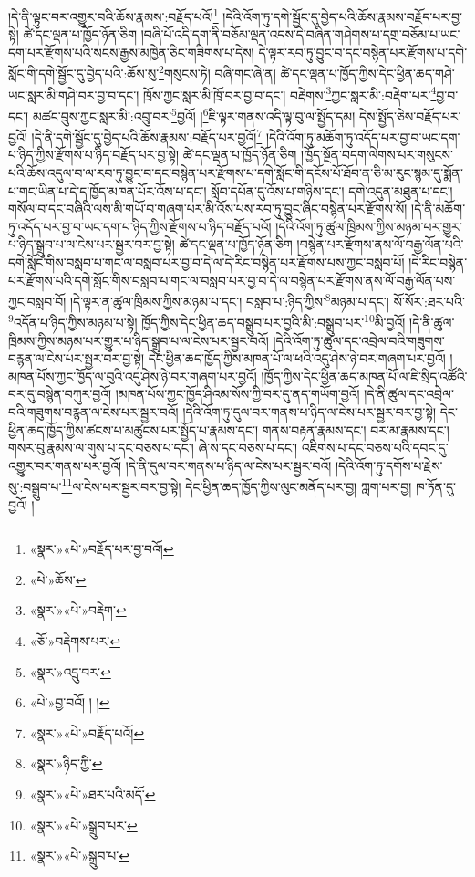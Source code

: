 །དེ་ནི་ལྟུང་བར་འགྱུར་བའི་ཆོས་རྣམས་:བརྗོད་པའོ།\footnote{«སྣར་»«པེ་»བརྗོད་པར་བྱ་བའོ།} །དེའི་འོག་ཏུ་དགེ་སྦྱོང་དུ་བྱེད་པའི་ཆོས་རྣམས་བརྗོད་པར་བྱ་སྟེ། ཚེ་དང་ལྡན་པ་ཁྱོད་ཉོན་ཅིག །བཞི་པོ་འདི་དག་ནི་བཅོམ་ལྡན་འདས་དེ་བཞིན་གཤེགས་པ་དགྲ་བཅོམ་པ་ཡང་དག་པར་རྫོགས་པའི་སངས་རྒྱས་མཁྱེན་ཅིང་གཟིགས་པ་དེས། དེ་ལྟར་རབ་ཏུ་བྱུང་བ་དང་བསྙེན་པར་རྫོགས་པ་དགེ་སློང་གི་དགེ་སྦྱོང་དུ་བྱེད་པའི་:ཆོས་སུ་\footnote{«པེ་»ཆོས་}གསུངས་ཏེ། བཞི་གང་ཞེ་ན། ཚེ་དང་ལྡན་པ་ཁྱོད་ཀྱིས་དེང་ཕྱིན་ཆད་གཤེ་ཡང་སླར་མི་གཤེ་བར་བྱ་བ་དང་། ཁྲོས་ཀྱང་སླར་མི་ཁྲོ་བར་བྱ་བ་དང་། བརྡེགས་\footnote{«སྣར་»«པེ་»བརྡེག་}ཀྱང་སླར་མི་:བརྡེག་པར་\footnote{«ཅོ་»བརྡེགས་པར་}བྱ་བ་དང་། མཚང་བྲུས་ཀྱང་སླར་མི་:འབྲུ་བར་\footnote{«སྣར་»འདྲུ་བར་}བྱའོ། །\footnote{«པེ་»བྱ་བའོ། ། །}ཇི་ལྟར་གནས་འདི་ལྟ་བུ་ལ་སྤྱོད་དམ། དེས་སྤྱོད་ཅེས་བརྗོད་པར་བྱའོ། །དེ་ནི་དགེ་སྦྱོང་དུ་བྱེད་པའི་ཆོས་རྣམས་:བརྗོད་པར་བྱའོ།\footnote{«སྣར་»«པེ་»བརྗོད་པའོ།} །དེའི་འོག་ཏུ་མཆོག་ཏུ་འདོད་པར་བྱ་བ་ཡང་དག་པ་ཉིད་ཀྱིས་རྫོགས་པ་ཉིད་བརྗོད་པར་བྱ་སྟེ། ཚེ་དང་ལྡན་པ་ཁྱོད་ཉོན་ཅིག །ཁྱོད་སྔོན་བདག་ལེགས་པར་གསུངས་པའི་ཆོས་འདུལ་བ་ལ་རབ་ཏུ་བྱུང་བ་དང་བསྙེན་པར་རྫོགས་པ་དགེ་སློང་གི་དངོས་པོ་ཐོབ་ན་ཅི་མ་རུང་སྙམ་དུ་སྨོན་པ་གང་ཡིན་པ་དེ་ད་ཁྱོད་མཁན་པོར་འོས་པ་དང་། སློབ་དཔོན་དུ་འོས་པ་གཉིས་དང་། དགེ་འདུན་མཐུན་པ་དང་། གསོལ་བ་དང་བཞིའི་ལས་མི་གཡོ་བ་གཞག་པར་མི་འོས་པས་རབ་ཏུ་བྱུང་ཞིང་བསྙེན་པར་རྫོགས་སོ། །དེ་ནི་མཆོག་ཏུ་འདོད་པར་བྱ་བ་ཡང་དག་པ་ཉིད་ཀྱིས་རྫོགས་པ་ཉིད་བརྗོད་པའོ། །དེའི་འོག་ཏུ་ཚུལ་ཁྲིམས་ཀྱིས་མཉམ་པར་གྱུར་པ་ཉིད་སྒྲུབ་པ་ལ་ངེས་པར་སྦྱར་བར་བྱ་སྟེ། ཚེ་དང་ལྡན་པ་ཁྱོད་ཉོན་ཅིག །བསྙེན་པར་རྫོགས་ནས་ལོ་བརྒྱ་ལོན་པའི་དགེ་སློང་གིས་བསླབ་པ་གང་ལ་བསླབ་པར་བྱ་བ་དེ་ལ་དེ་རིང་བསྙེན་པར་རྫོགས་པས་ཀྱང་བསླབ་པོ། །དེ་རིང་བསྙེན་པར་རྫོགས་པའི་དགེ་སློང་གིས་བསླབ་པ་གང་ལ་བསླབ་པར་བྱ་བ་དེ་ལ་བསྙེན་པར་རྫོགས་ནས་ལོ་བརྒྱ་ལོན་པས་ཀྱང་བསླབ་བོ། །དེ་ལྟར་ན་ཚུལ་ཁྲིམས་ཀྱིས་མཉམ་པ་དང་། བསླབ་པ་:ཉིད་ཀྱིས་\footnote{«སྣར་»ཉིད་ཀྱི་}མཉམ་པ་དང་། སོ་སོར་:ཐར་པའི་\footnote{«སྣར་»«པེ་»ཐར་པའི་མདོ་}འདོན་པ་ཉིད་ཀྱིས་མཉམ་པ་སྟེ། ཁྱོད་ཀྱིས་དེང་ཕྱིན་ཆད་བསྒྲུབ་པར་བྱའི་མི་:བསྒྲུབ་པར་\footnote{«སྣར་»«པེ་»སྒྲུབ་པར་}མི་བྱའོ། །དེ་ནི་ཚུལ་ཁྲིམས་ཀྱིས་མཉམ་པར་གྱུར་པ་ཉིད་སྒྲུབ་པ་ལ་ངེས་པར་སྦྱར་བའོ། །དེའི་འོག་ཏུ་ཚུལ་དང་འབྲེལ་བའི་གཟུགས་བརྙན་ལ་ངེས་པར་སྦྱར་བར་བྱ་སྟེ། དེང་ཕྱིན་ཆད་ཁྱོད་ཀྱིས་མཁན་པོ་ལ་ཕའི་འདུ་ཤེས་ཉེ་བར་གཞག་པར་བྱའོ། །མཁན་པོས་ཀྱང་ཁྱོད་ལ་བུའི་འདུ་ཤེས་ཉེ་བར་གཞག་པར་བྱའོ། །ཁྱོད་ཀྱིས་དེང་ཕྱིན་ཆད་མཁན་པོ་ལ་ཇི་སྲིད་འཚོའི་བར་དུ་བསྙེན་བཀུར་བྱའོ། །མཁན་པོས་ཀྱང་ཁྱོད་ཤིའམ་སོས་ཀྱི་བར་དུ་ནད་གཡོག་བྱའོ། །དེ་ནི་ཚུལ་དང་འབྲེལ་བའི་གཟུགས་བརྙན་ལ་ངེས་པར་སྦྱར་བའོ། །དེའི་འོག་ཏུ་དུལ་བར་གནས་པ་ཉིད་ལ་ངེས་པར་སྦྱར་བར་བྱ་སྟེ། དེང་ཕྱིན་ཆད་ཁྱོད་ཀྱིས་ཚངས་པ་མཚུངས་པར་སྤྱོད་པ་རྣམས་དང་། གནས་བརྟན་རྣམས་དང་། བར་མ་རྣམས་དང་། གསར་བུ་རྣམས་ལ་གུས་པ་དང་བཅས་པ་དང་། ཞེ་ས་དང་བཅས་པ་དང་། འཇིགས་པ་དང་བཅས་པའི་དབང་དུ་འགྱུར་བར་གནས་པར་བྱའོ། །དེ་ནི་དུལ་བར་གནས་པ་ཉིད་ལ་ངེས་པར་སྦྱར་བའོ། །དེའི་འོག་ཏུ་དགོས་པ་རྗེས་སུ་:བསྒྲུབ་པ་\footnote{«སྣར་»«པེ་»སྒྲུབ་པ་}ལ་ངེས་པར་སྦྱར་བར་བྱ་སྟེ། དེང་ཕྱིན་ཆད་ཁྱོད་ཀྱིས་ལུང་མནོད་པར་བྱ། ཀླག་པར་བྱ། ཁ་ཏོན་དུ་བྱའོ། །
